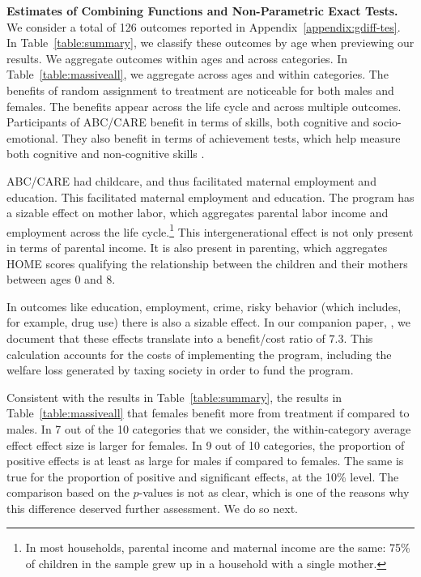 \textbf{Estimates of Combining Functions and Non-Parametric Exact Tests.} We consider a total of 126 outcomes reported in Appendix~\ref{appendix:gdiff-tes}. In Table~\ref{table:summary}, we classify these outcomes by age when previewing our results. We aggregate outcomes within ages and across categories. In Table~\ref{table:massiveall}, we aggregate across ages and within categories. The benefits of random assignment to treatment are noticeable for both males and females. The benefits appear across the life cycle and across multiple outcomes. Participants of ABC/CARE benefit in terms of skills, both cognitive and socio-emotional. They also benefit in terms of achievement tests, which help measure both cognitive and non-cognitive skills \citep{Almlund_Duckworth_etal_2011_ecoval}.

ABC/CARE had childcare, and thus facilitated maternal employment and education. This facilitated maternal employment and education. The program has a sizable effect on mother labor, which aggregates parental labor income and employment across the life cycle.\footnote{In most households, parental income and maternal income are the same: 75\% of children in the sample grew up in a household with a single mother.} This intergenerational effect is not only present in terms of parental income. It is also present in parenting, which aggregates HOME scores qualifying the relationship between the children and their mothers between ages 0 and 8.

In outcomes like education, employment, crime, risky behavior (which includes, for example, drug use) there is also a sizable effect. In our companion paper, \citet{Garcia_Heckman_Leaf_etal_2017_Comp_CBA_Unpublished}, we document that these effects translate into a benefit/cost ratio of $7.3$. This calculation accounts for the costs of implementing the program, including the welfare loss generated by taxing society in order to fund the program.

Consistent with the results in Table~\ref{table:summary}, the results in Table~\ref{table:massiveall} that females benefit more from treatment if compared to males. In 7 out of the 10 categories that we consider, the within-category average effect effect size is larger for females. In 9 out of 10 categories, the proportion of positive effects is at least as large for males if compared to females. The same is true for the proportion of positive and significant effects, at the 10\% level. The comparison based on the \citet{} $p$-values is not as clear, which is one of the reasons why this difference deserved further assessment. We do so next.


